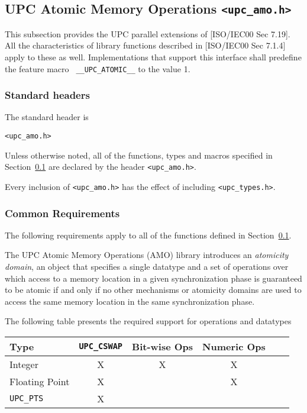 \subsection{UPC Atomic Memory Operations {\tt <upc\_amo.h>}}
\label{upc-amo}

\npf This subsection provides the UPC parallel extensions of [ISO/IEC00 
    Sec 7.19].  All the characteristics of library functions described
    in [ISO/IEC00 Sec 7.1.4] apply to these as well.  Implementations
    that support this interface shall predefine the feature macro {\tt
    \_\_UPC\_ATOMIC\_\_} to the value 1.

\subsubsection{Standard headers}

\np The standard header is

{\tt <upc\_amo.h>}

\np Unless otherwise noted, all of the functions, types and macros specified
    in Section~\ref{upc-amo} are declared by the header {\tt <upc\_amo.h>}.

\np Every inclusion of {\tt <upc\_amo.h>} has the effect of including
    {\tt <upc\_types.h>}.

\subsubsection{Common Requirements}
\label{upc-amo-reqs}
\npf The following requirements apply to all of the functions defined
     in Section~\ref{upc-amo}.

\np The UPC Atomic Memory Operations (AMO) library introduces an
    \emph{atomicity domain}, an object that specifies a single datatype and
    a set of operations over which access to a memory location in a given
    synchronization phase is guaranteed to be atomic if and only if no other
    mechanisms or atomicity domains are used to access the same memory
    location in the same synchronization phase.

\np The following table presents the required support for operations and
    datatypes

\begin{center}
\begin{tabular}{l|ccccc}
Type           & {\tt UPC\_CSWAP} & Bit-wise Ops & Numeric Ops \\ \hline
Integer        &  X               &  X           &  X          \\
Floating Point &  X               &              &  X          \\
{\tt UPC\_PTS} &  X               &              &             \\
\end{tabular}
\end{center}

